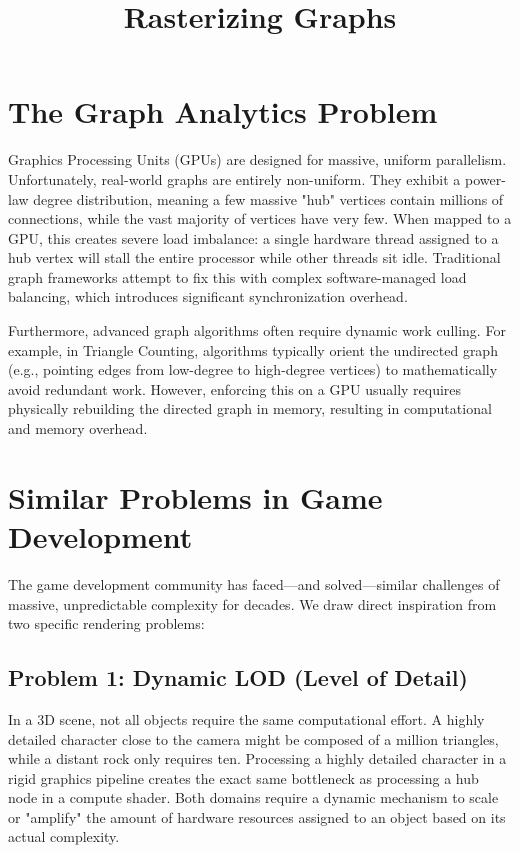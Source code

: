 \documentclass[11pt, a4paper]{article}
\title{Rasterizing Graphs}
\author{}
\date{}
\begin{document}
\maketitle

\section{The Graph Analytics Problem}

Graphics Processing Units (GPUs) are designed for massive, uniform parallelism. Unfortunately, real-world graphs are entirely non-uniform. They exhibit a power-law degree distribution, meaning a few massive "hub" vertices contain millions of connections, while the vast majority of vertices have very few. When mapped to a GPU, this creates severe load imbalance: a single hardware thread assigned to a hub vertex will stall the entire processor while other threads sit idle. Traditional graph frameworks attempt to fix this with complex software-managed load balancing, which introduces significant synchronization overhead.

Furthermore, advanced graph algorithms often require dynamic work culling. For example, in Triangle Counting, algorithms typically orient the undirected graph (e.g., pointing edges from low-degree to high-degree vertices) to mathematically avoid redundant work. However, enforcing this on a GPU usually requires physically rebuilding the directed graph in memory, resulting in computational and memory overhead.

\section{Similar Problems in Game Development}

The game development community has faced---and solved---similar challenges of massive, unpredictable complexity for decades. We draw direct inspiration from two specific rendering problems:

\subsection{Problem 1: Dynamic LOD (Level of Detail)}
In a 3D scene, not all objects require the same computational effort. A highly detailed character close to the camera might be composed of a million triangles, while a distant rock only requires ten. Processing a highly detailed character in a rigid graphics pipeline creates the exact same bottleneck as processing a hub node in a compute shader. Both domains require a dynamic mechanism to scale or "amplify" the amount of hardware resources assigned to an object based on its actual complexity.
\end{document}
